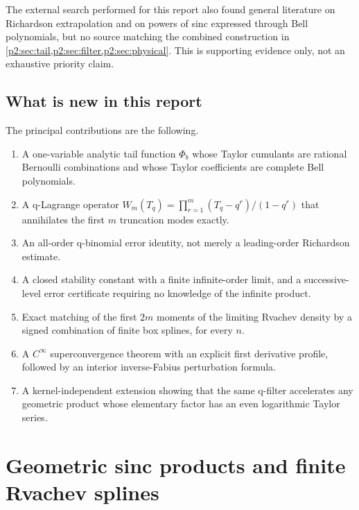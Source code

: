 \documentclass[11pt,oneside]{article}
\numberwithin{equation}{section}
\theoremstyle{definition}
\theoremstyle{remark}
\begin{document}
The external search performed for this report also found general literature on
Richardson extrapolation and on powers of sinc expressed through Bell
polynomials, but no source matching the combined construction in
\cref{p2:sec:tail,p2:sec:filter,p2:sec:physical}. This is supporting evidence only, not an
exhaustive priority claim.

\subsection{What is new in this report}

The principal contributions are the following.

\begin{enumerate}[label=\textbf{N\arabic*.},leftmargin=12mm]
\item A one-variable analytic tail function \(\Phi_b\) whose Taylor cumulants
are rational Bernoulli combinations and whose Taylor coefficients are complete
Bell polynomials.

\item A q-Lagrange operator
\(W_m(T_q)=\prod_{r=1}^m(T_q-q^r)/(1-q^r)\) that annihilates the first \(m\)
truncation modes exactly.

\item An all-order q-binomial error identity, not merely a leading-order
Richardson estimate.

\item A closed stability constant with a finite infinite-order limit, and a
successive-level error certificate requiring no knowledge of the infinite
product.

\item Exact matching of the first \(2m\) moments of the limiting Rvachev density
by a signed combination of finite box splines, for every \(n\).

\item A \(C^\infty\) superconvergence theorem with an explicit first derivative
profile, followed by an interior inverse-Fabius perturbation formula.

\item A kernel-independent extension showing that the same q-filter accelerates
any geometric product whose elementary factor has an even logarithmic Taylor
series.
\end{enumerate}

\section{Geometric sinc products and finite Rvachev splines}
\label{p2:sec:setup}
\end{document}
